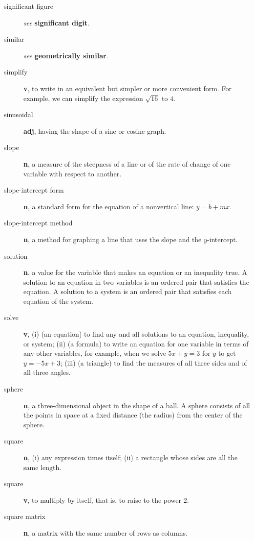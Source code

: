 \documentclass[10pt,]{book}
\newcommand{\terminology}[1]{\textbf{#1}}
\theoremstyle{plain}
\theoremstyle{definition}
\theoremstyle{definition}
\theoremstyle{definition}
\numberwithin{equation}{part}
\begin{document}
\begin{description}
\item[{significant figure}]\hypertarget{li-797}{}\emph{see} \terminology{significant digit}.%
\item[{similar}]\hypertarget{li-798}{}\emph{see} \terminology{geometrically similar}.%
\item[{simplify}]\hypertarget{li-799}{}\terminology{v}, to write in an equivalent but simpler or more convenient form. For example, we can simplify the expression \(\sqrt{16}\) to \(4\).%
\item[{sinusoidal}]\hypertarget{li-800}{}\terminology{adj}, having the shape of a sine or cosine graph.%
\item[{slope}]\hypertarget{li-801}{}\terminology{n}, a measure of the steepness of a line or of the rate of change of one variable with respect to another.%
\item[{slope-intercept form}]\hypertarget{li-802}{}\terminology{n}, a standard form for the equation of a nonvertical line: \(y = b + mx\).%
\item[{slope-intercept method}]\hypertarget{li-803}{}\terminology{n}, a method for graphing a line that uses the slope and the \(y\)-intercept.%
\item[{solution}]\hypertarget{li-804}{}\terminology{n}, a value for the variable that makes an equation or an inequality true. A solution to an equation in two variables is an ordered pair that satisfies the equation. A solution to a system is an ordered pair that satisfies each equation of the system.%
\item[{solve}]\hypertarget{li-805}{}\terminology{v}, (i) (an equation) to find any and all solutions to an equation, inequality, or system; (ii) (a formula) to write an equation for one variable in terms of any other variables, for example, when we solve \(5x + y = 3\) for \(y\) to get \(y = −5x + 3\); (iii) (a triangle) to find the measures of all three sides and of all three angles.%
\item[{sphere}]\hypertarget{li-806}{}\terminology{n}, a three-dimensional object in the shape of a ball. A sphere consists of all the points in space at a fixed distance (the radius) from the center of the sphere.%
\item[{square}]\hypertarget{li-807}{}\terminology{n}, (i) any expression times itself; (ii) a rectangle whose sides are all the same length.%
\item[{square}]\hypertarget{li-808}{}\terminology{v}, to multiply by itself, that is, to raise to the power \(2\).%
\item[{square matrix}]\hypertarget{li-809}{}\terminology{n}, a matrix with the same number of rows as columns.%

\end{description}
\end{document}
